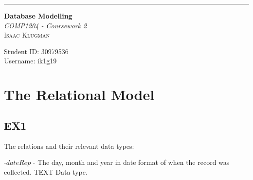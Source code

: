 \documentclass[12pt]{article}
\begin{document}
%
%

\begin{titlepage} %
	
	\raggedleft %
	
	\rule{1pt}{\textheight} %
	\hspace{0.05\textwidth} %
	\parbox[b]{0.75\textwidth}{ %
		
		{\Huge\bfseries Database Modelling}\\[2\baselineskip] %
		{\large\textit{COMP1204 - Coursework 2}}\\[4\baselineskip] %
		{\Large\textsc{Isaac Klugman}} %
		
		\vspace{0.5\textheight} %
		
		{\noindent Student ID: 30979536}\\[\baselineskip] %
		{\noindent Username: ik1g19}\\[\baselineskip] %
	}

\end{titlepage}


\pagebreak

\section*{The Relational Model}

\subsection*{EX1}

The relations and their relevant data types:

-$dateRep$ - The day, month and year in date format of when the record was collected. TEXT Data type.
\end{document}
